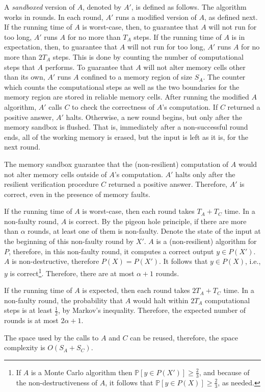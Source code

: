 \documentclass{llncs}
\begin{document}
\begin{pf}
A \emph{sandboxed} version of $A$, denoted by $A'$, is defined as follows. The algorithm works in rounds. In each round, $A'$ runs a modified version of $A$, as defined next. If the running time of $A$ is worst-case, then, to guarantee that $A$ will not run for too long, $A'$ runs $A$ for no more than $T_A$ steps. If the running time of $A$ is in expectation, then, to guarantee that $A$ will not run for too long, $A'$ runs $A$ for no more than $2T_A$ steps. This is done by counting the number of computational steps that $A$ performs. To guarantee that $A$ will not alter memory cells other than its own, $A'$ runs $A$ confined to a memory region of size $S_A$. The counter which counts the computational steps as well as the two boundaries for the memory region are stored in reliable memory cells. After running the modified $A$ algorithm, $A'$ calls $C$ to check the correctness of $A$'s computation. If $C$ returned a positive answer, $A'$ halts. Otherwise, a new round begins, but only after the memory sandbox is flushed. That is, immediately after a non-successful round ends, all of the working memory is erased, but the input is left as it is, for the next round.

The memory sandbox guarantee that the (non-resilient) computation of $A$ would not alter memory cells outside of $A$'s computation. $A'$ halts only after the resilient verification procedure $C$ returned a positive answer. Therefore, $A'$ is correct, even in the presence of memory faults.

If the running time of $A$ is worst-case, then each round takes $T_A+T_C$ time. In a non-faulty round, $A$ is correct. By the pigeon hole principle, if there are more than $\alpha$ rounds, at least one of them is non-faulty. Denote the state of the input at the beginning of this non-faulty round by $X'$. $A$ is a (non-resilient) algorithm for $P$, therefore, in this non-faulty round, it computes a correct output $y \in P(X')$. $A$ is non-destructive, therefore $P(X) = P(X')$. It follows that $y \in P(X)$, i.e., $y$ is correct\footnote{If $A$ is a Monte Carlo algorithm then $\mathbb{P}\left[y \in P(X')\right] \geq \frac{2}{3}$, and because of the non-destructiveness of $A$, it follows that $\mathbb{P}\left[y \in P(X)\right] \geq \frac{2}{3}$, as needed.}. Therefore, there are at most $\alpha+1$ rounds.

If the running time of $A$ is expected, then each round takes $2T_A+T_C$ time. In a non-faulty round, the probability that $A$ would halt within $2T_A$ computational steps is at least $\frac{1}{2}$, by Markov's inequality. Therefore, the expected number of rounds is at most $2 \alpha + 1$.

The space used by the calls to $A$ and $C$ can be reused, therefore, the space complexity is $O(S_A + S_C)$.~\end{pf}
\end{document}
